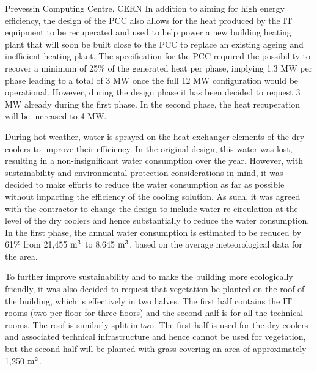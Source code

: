 \documentclass[../SustainableHEP.tex]{subfiles}
\begin{document}
\begin{bestpractice}{Prevessin Computing Centre, CERN}
In addition to aiming for high energy efficiency, the design of the PCC
also allows for the heat produced by the IT equipment to be recuperated
and used to help power a new building heating plant that will soon be
built close to the PCC to replace an existing ageing and inefficient
heating plant. 
The specification for the PCC required the possibility
to recover a minimum of 25\% of the generated heat per phase, implying
1.3 MW per phase leading to a total of 3 MW once the full 12 MW
configuration would be operational. However, during the design phase it
has been decided to request 3 MW already during the first phase. In the
second phase, the heat recuperation will be increased to 4 MW.

During hot weather, water is sprayed on the heat exchanger elements of
the dry coolers to improve their efficiency. In the original design, this
water was lost, resulting in a non-insignificant water consumption over
the year. However, with sustainability and environmental protection
considerations in mind, it was decided to make efforts to reduce the
water consumption as far as possible without impacting the efficiency of
the cooling solution. As such, it was agreed with the contractor to
change the design to include water re-circulation at the level of the dry
coolers and hence substantially to reduce the water consumption. In the
first phase, the annual water consumption is estimated to be reduced by 61\% from
21,455 ${\rm m}^3$ to 8,645 ${\rm m}^3$, based on the average meteorological data for the area.

To further improve sustainability and to make the building more
ecologically friendly, it was also decided to request that vegetation be
planted on the roof of the building, which is effectively in two halves.
The first half contains the IT rooms (two per floor for three floors) and
the second half is for all the technical rooms. The roof is similarly
split in two. The first half is used for the dry coolers and associated
technical infrastructure and hence cannot be used for vegetation, but
the second half will be planted with grass covering an area of
approximately 1,250 ${\rm m}^2$.
\end{bestpractice}
\end{document}
